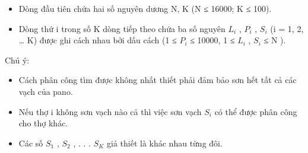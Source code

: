 \begin{itemize}
	\item     Dòng đầu tiên chứa hai số nguyên dương N, K (N ≤ 16000; K ≤ 100).   
	\item     Dòng thứ i trong số K dòng tiếp theo chứa ba số nguyên  $L_{i}$    , $P_{i}$    , $S_{i}$    (i = 1, 2, … K) được ghi cách nhau bởi dấu cách (1 ≤  $P_{i}$    ≤ 10000, 1 ≤   $L_{i}$    , $S_{i}$    ≤  N ).   
\end{itemize}

   Chú ý:  
\begin{itemize}
	\item     Cách phân công tìm được không nhất thiết phải đảm bảo sơn hết tất cả các vạch của pano.   
	\item     Nếu thợ i không sơn vạch nào cả thì việc sơn vạch $S_{i}$    có thể được phân công cho thợ khác.   
	\item     Các số $S_{1}$    , $S_{2}$    , . . . $S_{K}$    giả thiết là khác nhau từng đôi.   
\end{itemize}